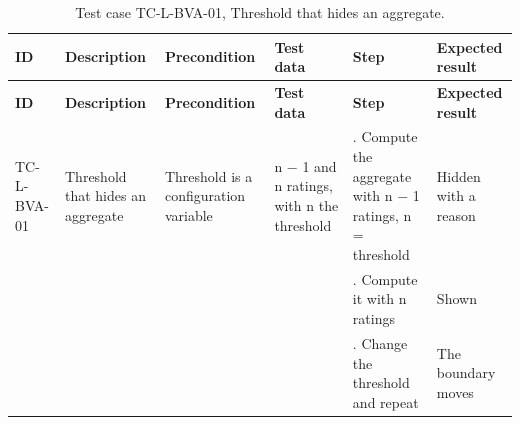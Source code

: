 {\footnotesize{}\renewcommand{\arraystretch}{1.1}
\begin{longtable}{|>{\raggedright\arraybackslash}p{}|>{\raggedright\arraybackslash}p{}|>{\raggedright\arraybackslash}p{}|>{\raggedright\arraybackslash}p{}|>{\raggedright\arraybackslash}p{}|>{\raggedright\arraybackslash}p{}|}
\caption{Test case TC-\allowbreak{}L-\allowbreak{}BVA-\allowbreak{}01, Threshold that hides an aggregate.} \\
\hline
\textbf{ID} & \textbf{Description} & \textbf{Precondition} & \textbf{Test data} & \textbf{Step} & \textbf{Expected result} \\ \hline
\endfirsthead
\hline
\textbf{ID} & \textbf{Description} & \textbf{Precondition} & \textbf{Test data} & \textbf{Step} & \textbf{Expected result} \\ \hline
\endhead
TC-L-BVA-01 & Threshold that hides an aggregate & Threshold is a configuration variable & n $-$ 1 and n ratings, with n the threshold & 1. Compute the aggregate with n $-$ 1 ratings, n = threshold & Hidden with a reason \\ \cline{5-6}
 &  &  &  & 2. Compute it with n ratings & Shown \\ \cline{5-6}
 &  &  &  & 3. Change the threshold and repeat & The boundary moves \\ \hline
\end{longtable}
}

